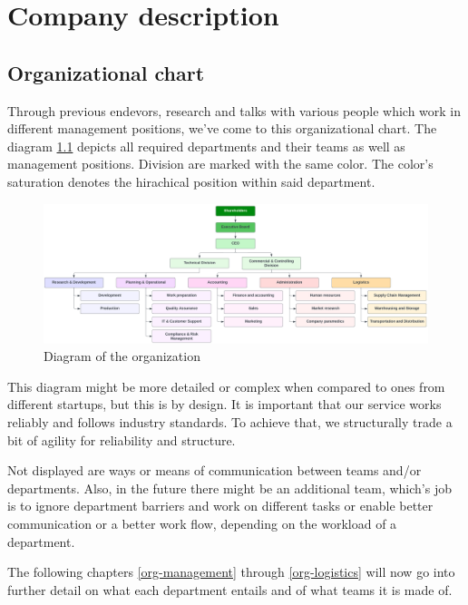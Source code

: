 \chapter{Company description}
\section{Organizational chart}
Through previous endevors, research and talks with various people which work in different management positions, we've come to this organizational chart. The diagram \ref{fig:organisational-chart} depicts all required departments and their teams as well as management positions. Division are marked with the same color. The color's saturation denotes the hirachical position within said department.

\begin{figure}[!ht]
  \centering
  \includegraphics[width=\linewidth]{./images/organisational-chart.png}
  \caption[Organizational chart made with lucidchart.com]{Diagram of the organization}
  \label{fig:organisational-chart}
\end{figure}

This diagram might be more detailed or complex when compared to ones from different startups, but this is by design. It is important that our service works reliably and follows industry standards. To achieve that, we structurally trade a bit of agility for reliability and structure.

Not displayed are ways or means of communication between teams and/or departments. Also, in the future there might be an additional team, which's job is to ignore department barriers and work on different tasks or enable better communication or a better work flow, depending on the workload of a department.

The following chapters \ref{org-management} through \ref{org-logistics} will now go into further detail on what each department entails and of what teams it is made of.
